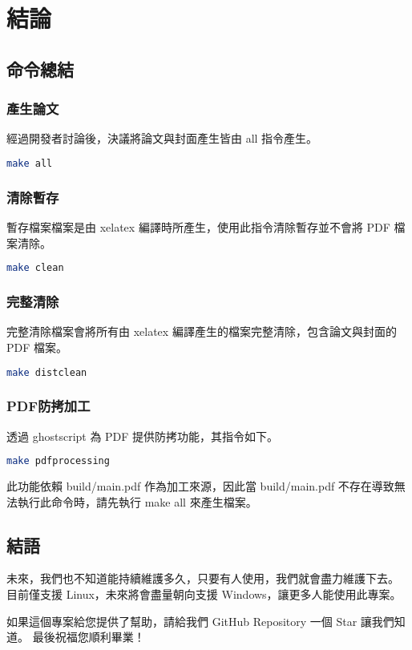 
\chapter{結論} \label{conclusion_and_future}

\section{命令總結}

\subsection*{產生論文}

經過開發者討論後，決議將論文與封面產生皆由 all 指令產生。

\begin{lstlisting}[language=bash]
    make all
\end{lstlisting}

\subsection*{清除暫存}

暫存檔案檔案是由 xelatex 編譯時所產生，使用此指令清除暫存並不會將 PDF 檔案清除。

\begin{lstlisting}[language=bash]
    make clean
\end{lstlisting}

\subsection*{完整清除}

完整清除檔案會將所有由 xelatex 編譯產生的檔案完整清除，包含論文與封面的 PDF 檔案。

\begin{lstlisting}[language=bash]
    make distclean
\end{lstlisting}

\subsection*{PDF防拷加工}

透過 ghostscript\cite{ghostscript} 為 PDF 提供防拷功能，其指令如下。

\begin{lstlisting}[language=bash]
    make pdfprocessing
\end{lstlisting}

此功能依賴 build/main.pdf 作為加工來源，因此當 build/main.pdf 不存在導致無法執行此命令時，請先執行 make all 來產生檔案。

\section{結語}

未來，我們也不知道能持續維護多久，只要有人使用，我們就會盡力維護下去。
目前僅支援 Linux，未來將會盡量朝向支援 Windows，讓更多人能使用此專案。

如果這個專案給您提供了幫助，請給我們 GitHub Repository\cite{github-repo} 一個 Star 讓我們知道。
最後祝福您順利畢業！
